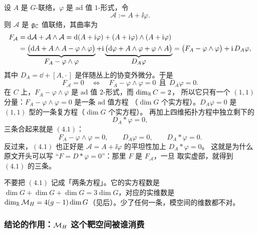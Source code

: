 设 $A$ 是 $G$-联络，$\varphi$ 是 $\mathrm{ad}$ 值 $1$-形式，令
\begin{equation}
\mathcal A:=A+\ii\varphi .
\label{eq:complex-connection}
\end{equation}
则 $\mathcal A$ 是 $\mathfrak{g}_{\mathbb{C}}$ 值联络，其曲率为
\begin{align}
F_{\mathcal A}
&=\mathrm{d}\mathcal A+\mathcal A\wedge\mathcal A
=\mathrm{d}(A+\mathrm{i}\varphi)+(A+\mathrm{i}\varphi)\wedge(A+\mathrm{i}\varphi)\notag\\
&=\underbrace{\bigl(\mathrm{d} A+A\wedge A-\varphi\wedge\varphi\bigr)}_{\textstyle F_A-\varphi\wedge\varphi}
+\mathrm{i}\underbrace{\bigl(\mathrm{d}\varphi+A\wedge\varphi+\varphi\wedge A\bigr)}_{\textstyle D_A\varphi}
=\bigl(F_A-\varphi\wedge\varphi\bigr)+\mathrm{i}\,D_A\varphi ,
\label{eq:curvature-split}
\end{align}
其中 $D_A=\dd+[A,\cdot\,]$ 是伴随丛上的协变外微分。于是
\begin{equation}
F_{\mathcal A}=0
\quad\Longleftrightarrow\quad
F_A-\varphi\wedge\varphi=0\ \ \text{且}\ \ D_A\varphi=0 .
\label{eq:curvature-zero}
\end{equation}
在 $C$ 上，$F_A-\varphi\wedge\varphi$ 是 $\mathrm{ad}$ 值 $2$-形式，而 $\dim_{\mathbb{R}} C=2$，
所以它只有一个 $(1,1)$ 分量：$F_A-\varphi\wedge\varphi=0$ 是一条 $\mathrm{ad}$ 值方程
（$\dim G$ 个实方程）。$D_A\varphi=0$ 是 $(1,1)$ 型的一条复方程（$\dim G$ 个实方程）。
再加上四维拓扑方程中独立剩下的
\begin{equation}
D_A{*}\varphi=0 ,
\label{eq:dstar}
\end{equation}
三条合起来就是 $(4.1)$：
\begin{equation}
F_A-\varphi\wedge\varphi=0,\qquad D_A\varphi=0,\qquad D_A{*}\varphi=0 .
\label{eq:hitchin}
\end{equation}
反过来，$(4.1)$ 也正好是 $\mathcal A=A+\ii\varphi$ 的平坦性加上 $D_A{*}\varphi=0$。
这就是为什么原文开头可以写 “$F=D{*}\varphi=0$”：那里 $F$ 是 $F_{\mathcal A}$，一旦
取实虚部，就得到 $(4.1)$ 的三条。\pB{}\pB{}

\begin{warn}
不要把 $(4.1)$ 记成「两条方程」。它的实方程数是
$\dim G+\dim G+\dim G=3\dim G$，对应的实维数是
$\dim_{\mathbb{R}}\mathcal{M}_H=4(g-1)\dim G$（见后）。少了任何一条，模空间的维数都不对。
\end{warn}

\subsubsection*{结论的作用：$\mathcal{M}_H$ 这个靶空间被谁消费}

